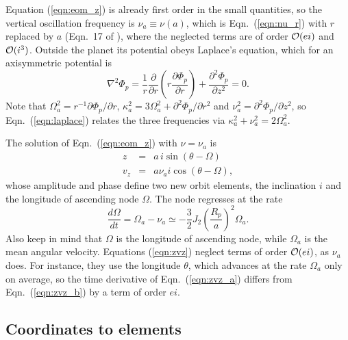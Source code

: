 \documentclass[twocolumn]{aastex702}
\begin{document}
Equation (\ref{eqn:eom_z}) is already first order in the small quantities, so the vertical oscillation
frequency is $\nu_a \equiv \nu(a)$, which is Eqn.\ (\ref{eqn:nu_r}) with $r$ replaced by $a$ (Eqn.\ 17 of
\citealt{BL94}), where the neglected terms are of order ${\cal O}(ei)$ and ${\cal O}(i^3)$. Outside the planet its potential
obeys Laplace's equation, which for an axisymmetric
potential is
\begin{equation}
    \label{eqn:laplace}
    \nabla^2\Phi_p = \frac{1}{r}\frac{\partial}{\partial r}\left(r\frac{\partial\Phi_p}{\partial r}\right)
        + \frac{\partial^2\Phi_p}{\partial z^2} = 0.
\end{equation}
Note that $\Omega_a^2 = r^{-1}\partial\Phi_p/\partial r$,
$\kappa_a^2 = 3\Omega_a^2 + \partial^2\Phi_p/\partial r^2$ and
$\nu_a^2 = \partial^2\Phi_p/\partial z^2$, so Eqn.\ (\ref{eqn:laplace}) relates the three
frequencies via $\kappa_a^2 + \nu_a^2 = 2\Omega_a^2$.

The solution of Eqn.\ (\ref{eqn:eom_z}) with $\nu = \nu_a$ is
\begin{subequations}
\label{eqn:zvz}
\begin{eqnarray}
    z   &=& a\,i\sin(\theta - \Omega) \label{eqn:zvz_a}\\
    v_z &=& a\nu_a i\cos(\theta - \Omega), \label{eqn:zvz_b}
\end{eqnarray}
\end{subequations}
whose amplitude and phase define two new orbit elements, the inclination $i$ and the longitude of
ascending node $\Omega$. The node regresses at the rate
\begin{equation}
    \label{eqn:node}
    \frac{d\Omega}{dt} = \Omega_a - \nu_a \simeq -\frac{3}{2}J_2\left(\frac{R_p}{a}\right)^2\Omega_a.
\end{equation}
Also keep in mind that $\Omega$ is the longitude of ascending node, while $\Omega_a$ is the mean angular
velocity. Equations (\ref{eqn:zvz}) neglect terms of order ${\cal O}(ei)$, as $\nu_a$ does. For instance, they use
the longitude $\theta$, which advances at the rate $\Omega_a$ only on average, so the time derivative of
Eqn.\ (\ref{eqn:zvz_a}) differs from Eqn.\ (\ref{eqn:zvz_b}) by a term of order $ei$.

\subsection{Coordinates to elements}
\label{sec:coords2elem}
\end{document}
